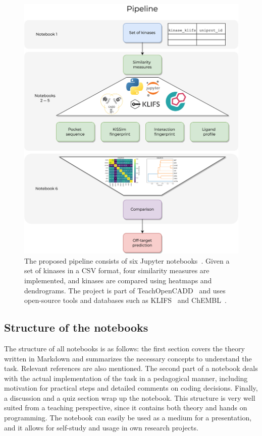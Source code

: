 \documentclass[9pt,training]{livecoms}
\begin{document}
\begin{figure}[ht]
    \centering
    \includegraphics[width=\columnwidth]{Pipeline.png}
    \caption{The proposed pipeline consists of six Jupyter notebooks~\cite{Kluyver_2016_Jupyter}. Given a set of kinases in a CSV format, four similarity measures are implemented, and kinases are compared using heatmaps and dendrograms. The project is part of TeachOpenCADD~\cite{Sydow_2019_JCheminform, Sydow_2021_toc_chemrxiv} and uses open-source tools and databases such as KLIFS~\cite{Kanev_2020_NAR} and ChEMBL~\cite{Gaulton_2016_nar}.}
    \label{fig:pipeline}
\end{figure}

\subsection{Structure of the notebooks}
The structure of all notebooks is as follows: the first section covers the theory written in Markdown and summarizes the necessary concepts to understand the task. Relevant references are also mentioned. The second part of a notebook deals with the actual implementation of the task in a pedagogical manner, including motivation for practical steps and detailed comments on coding decisions. Finally, a discussion and a quiz section wrap up the notebook.
This structure is very well suited from a teaching perspective, since it contains both theory and hands on programming. The notebook can easily be used as a medium for a presentation, and it allows for self-study and usage in own research projects.
\end{document}
